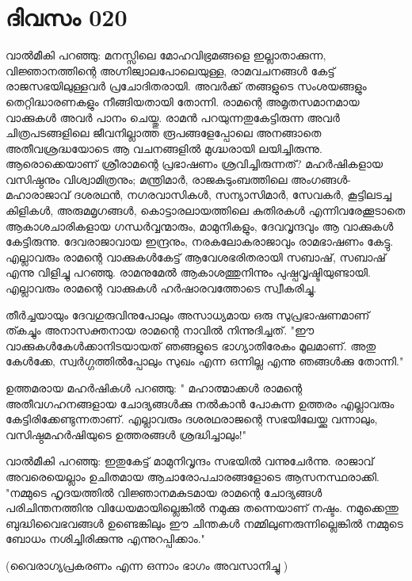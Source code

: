 \newpage
\section{ദിവസം 020}


വാല്‍മീകി പറഞ്ഞു: മനസ്സിലെ മോഹവിഭ്രമങ്ങളെ ഇല്ലാതാക്കുന്ന, വിജ്ഞാനത്തിന്റെ അഗ്നിജ്വാലപോലെയുള്ള, രാമവചനങ്ങള്‍ കേട്ട്‌ രാജസഭയിലുള്ളവര്‍ പ്രചോദിതരായി. അവര്‍ക്ക്‌ തങ്ങളുടെ സംശയങ്ങളും തെറ്റിദ്ധാരണകളും നീങ്ങിയതായി തോന്നി. രാമന്റെ അമൃതസമാനമായ വാക്കുകള്‍ അവര്‍ പാനം ചെയ്തു. രാമന്‍ പറയുന്നതുകേട്ടിരുന്ന അവര്‍ ചിത്രപടങ്ങളിലെ ജീവനില്ലാത്ത രൂപങ്ങളേപ്പോലെ അനങ്ങാതെ അതീവശ്രദ്ധയോടെ ആ വചനങ്ങളില്‍ മുഗ്ദ്ധരായി ലയിച്ചിരുന്നു. ആരൊക്കെയാണ്‌ ശ്രീരാമന്റെ പ്രഭാഷണം ശ്രവിച്ചിരുന്നത്‌? മഹര്‍ഷികളായ വസിഷ്ഠനും വിശ്വാമിത്രനും; മന്ത്രിമാര്‍, രാജകുടുംബത്തിലെ അംഗങ്ങള്‍- മഹാരാജാവ്‌ ദശരഥന്‍, നഗരവാസികള്‍, സന്യാസിമാര്‍, സേവകര്‍, കൂട്ടിലടച്ച കിളികള്‍, അരുമമൃഗങ്ങള്‍, കൊട്ടാരലായത്തിലെ കുതിരകള്‍ എന്നിവരേക്കൂടാതെ ആകാശചാരികളായ ഗന്ധര്‍വ്വന്മാരും, മാമുനികളും, ദേവവൃന്ദവും ആ വാക്കുകള്‍ കേട്ടിരുന്നു. ദേവരാജാവായ ഇന്ദ്രനും, നരകലോകരാജാവും രാമഭാഷണം കേട്ടു. എല്ലാവരും രാമന്റെ വാക്കുകള്‍കേട്ട്‌ ആവേശഭരിതരായി സബാഷ്‌, സബാഷ്‌ എന്നു വിളിച്ചു പറഞ്ഞു. രാമനുമേല്‍ ആകാശത്തുനിന്നും പുഷ്പവൃഷ്ടിയുണ്ടായി. എല്ലാവരും രാമന്റെ വാക്കുകള്‍ ഹര്‍ഷാരവത്തോടെ സ്വീകരിച്ചു.

തീര്‍ച്ചയായും ദേവഗുരുവിനുപോലും അസാധ്യമായ ഒരു സുപ്രഭാഷണമാണ്‌ ത്കച്ചും അനാസക്തനായ രാമന്റെ നാവില്‍ നിന്നുദിച്ചത്‌. "ഈ വാക്കുകള്‍കേള്‍ക്കാനിടയായത്‌ ഞങ്ങളുടെ ഭാഗ്യാതിരേകം മൂലമാണ്‌. അതു കേള്‍ക്കേ, സ്വര്‍ഗ്ഗത്തില്‍പ്പോലും സുഖം എന്ന ഒന്നില്ല എന്നു ഞങ്ങള്‍ക്കു തോന്നി."

ഉത്തമരായ മഹര്‍ഷികള്‍ പറഞ്ഞു: " മഹാത്മാക്കള്‍ രാമന്റെ അതീവഗഹനങ്ങളായ ചോദ്യങ്ങള്‍ക്കു നല്‍കാന്‍ പോകുന്ന ഉത്തരം എല്ലാവരും കേട്ടിരിക്കേണ്ടുന്നതാണ്‌. എല്ലാവരും ദശരഥരാജന്റെ സഭയിലേയ്ക്കു വന്നാലും, വസിഷ്ഠമഹര്‍ഷിയുടെ ഉത്തരങ്ങള്‍ ശ്രദ്ധിച്ചാലും!"

വാല്‍മീകി പറഞ്ഞു: ഇതുകേട്ട്‌ മാമുനിവൃന്ദം സഭയില്‍ വന്നുചേര്‍ന്നു. രാജാവ്‌ അവരെയെല്ലാം ഉചിതമായ ആചാരോപചാരങ്ങളോടെ ആസനസ്ഥരാക്കി. "നമ്മുടെ ഹൃദയത്തില്‍ വിജ്ഞാനമകുടമായ രാമന്റെ ചോദ്യങ്ങള്‍ പരിചിന്തനത്തിനു വിധേയമായില്ലെങ്കില്‍ നമുക്കു തന്നെയാണ്‌ നഷ്ടം. നമുക്കെന്തു ബുദ്ധിവൈഭവങ്ങള്‍ ഉണ്ടെങ്കിലും ഈ ചിന്തകള്‍ നമ്മിലുണരുന്നില്ലെങ്കില്‍ നമ്മുടെ ബോധം നശിച്ചിരിക്കുന്നു എന്നുറപ്പിക്കാം."

(വൈരാഗ്യപ്രകരണം എന്ന ഒന്നാം  ഭാഗം അവസാനിച്ചു )

